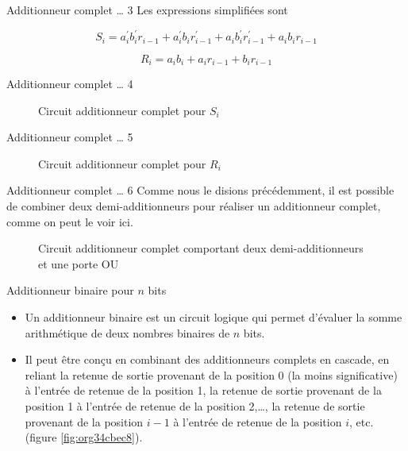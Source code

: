 \documentclass[presentation]{beamer}
\begin{document}
\begin{frame}[label={sec:orgb9c3bf5}]{Additionneur complet \ldots{} 3}
Les expressions simplifiées sont 

$$ S_{i} = a_i^\prime b_i^\prime r_{i-1} + a_i^\prime b_i
r_{i-1}^\prime + a_i b_i^\prime r_{i-1}^\prime + a_i b_i r_{i-1} $$

$$ R_{i} = a_i b_i + a_i r_{i-1} + b_i r_{i-1} $$
\end{frame}

\begin{frame}[label={sec:org05c6e8f}]{Additionneur complet \ldots{} 4}
\begin{figure}[htbp]
\centering

\caption{\label{fig:org0e8d729}Circuit additionneur complet pour \(S_i\)}
\end{figure}
\end{frame}

\begin{frame}[label={sec:orgab13184}]{Additionneur complet \ldots{} 5}
\begin{figure}[htbp]
\centering

\caption{\label{fig:orgcd1d091}Circuit additionneur complet pour \(R_i\)}
\end{figure}
\end{frame}

\begin{frame}[label={sec:org3b187b8}]{Additionneur complet \ldots{} 6}
Comme nous le disions précédemment, il est possible de combiner deux
demi-additionneurs pour réaliser un additionneur complet, comme on
peut le voir ici.


\begin{figure}[htbp]
\centering

\caption{\label{fig:org232fb6b}Circuit additionneur complet comportant deux demi-additionneurs et une porte OU}
\end{figure}
\end{frame}

\begin{frame}[label={sec:orgad5b3b3}]{Additionneur binaire pour \(n\) bits}
\begin{itemize}
\item Un additionneur binaire est un circuit logique qui permet d'évaluer
la somme arithmétique de deux nombres binaires de \(n\) bits.

\item Il peut être conçu en combinant des additionneurs complets en
cascade, en reliant la retenue de sortie provenant de la position 0
(la moins significative) à l'entrée de retenue de la position 1, la
retenue de sortie provenant de la position 1 à l'entrée de retenue
de la position 2,\ldots{}, la retenue de sortie provenant de la position
\(i-1\) à l'entrée de retenue de la position \(i\), etc. (figure
\ref{fig:org34cbec8}).
\end{itemize}
\end{frame}
\end{document}
